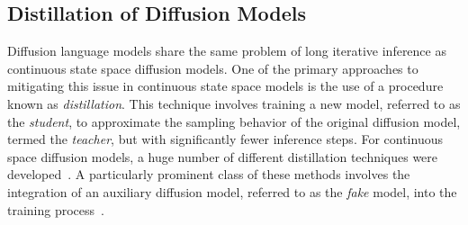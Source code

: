 \vspace{-1mm}
\subsection{Distillation of Diffusion Models} 
\vspace{-1mm}
  Diffusion language models share the same problem of long iterative inference as continuous state space diffusion models. One of the primary approaches to mitigating this issue in continuous state space models is the use of a procedure known as \emph{distillation}. This technique involves training a new model, referred to as the \textit{student}, to approximate the sampling behavior of the original diffusion model, termed the \textit{teacher}, but with significantly fewer inference steps. For continuous space diffusion models, a huge number of different distillation techniques were developed~\citep{luhman2021knowledge, salimans2022progressive, song2023consistency}. A particularly prominent class of these methods involves the integration of an auxiliary diffusion model, referred to as the \textit{fake} model, into the training process~\citep{yin2024one,yin2024improved,zhou2024score, zhou2024adversarial, huang2024flow, gushchin2025inverse, kornilov2025universal}.


